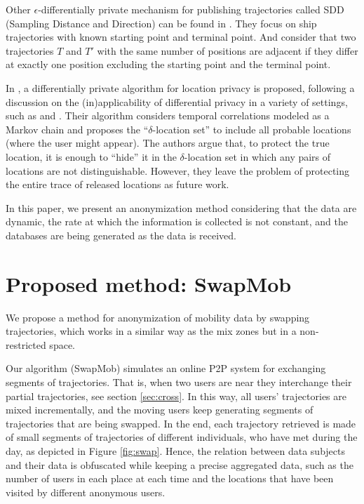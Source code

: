 \documentclass[]{llncs}
\begin{document}
Other $\epsilon$-differentially private mechanism for publishing trajectories called SDD (Sampling Distance and Direction) can be found in \cite{Jiang:2013}.
They focus on ship trajectories with known starting point and terminal point. 
And consider that two trajectories $T$ and $T'$ with the same number of positions are adjacent if they differ at exactly one position excluding the starting point and the terminal point.


In \cite{Xiao:2015}, a differentially private algorithm for location privacy is proposed, following a discussion on the (in)applicability of differential privacy in a variety of settings, such as \cite{Chatzik:2013} and  \cite{Kifer:2011}.
Their algorithm considers temporal correlations modeled as a Markov chain and proposes the ``$\delta$-location set'' to include all probable locations (where the user might appear). The authors argue that, to protect the true location, it is enough to “hide” it in the $\delta$-location set in which any pairs of locations are not distinguishable.
However, they leave the problem of protecting the entire trace of released locations as future work.


In this paper, we present an anonymization method considering that the data are dynamic, the rate at which the information is collected is not constant, and the databases are being generated as the data is received. 


\section{Proposed method: SwapMob}

We propose a method for anonymization of mobility data by swapping trajectories, which works in a similar way as the mix zones but in a non-restricted space.


Our algorithm (SwapMob) simulates an online P2P system for exchanging segments of trajectories. That is, when two users are near they interchange their partial trajectories, see section \ref{sec:cross}.
In this way, all users' trajectories are mixed incrementally, and the moving users keep generating segments of trajectories that are being swapped. In the end, each trajectory retrieved is made of small segments of trajectories of different individuals, who have met during the day, as depicted in Figure \ref{fig:swap}. Hence, the relation between data subjects and their data is obfuscated while keeping a precise aggregated data, such as the number of users in each place at each time and the locations that have been visited by different anonymous users. 
\end{document}
